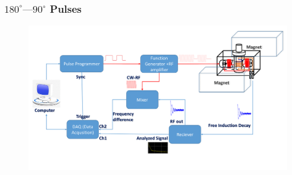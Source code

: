 \begin{frame}
  \frametitle{$180^{\circ}—90^{\circ}$ Pulses}
        \begin{center}
                \begin{figure}
                \begin{center}
                        \includegraphics[width=\linewidth]{./images/Figures/setup/circuit_diagram.png}
                \end{center}
                \caption{}
                \label{fig:setup}
                \end{figure}
        \end{center}
\end{frame}

